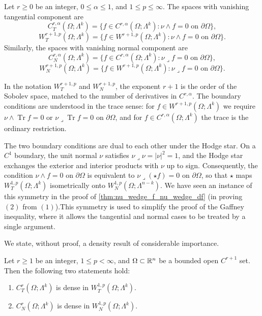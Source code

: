 \begin{definition}
\label{def:WTP-WNP}
Let $r\geq0$ be an integer, $0\leq\alpha\leq1$, and $1\leq p\leq\infty$. The spaces with vanishing tangential component are
\[
    C^{r,\alpha}_T(\Omega;\Lambda^k)
    =
    \bigl\{f\in C^{r,\alpha}(\Omega;\Lambda^k):
    \nu\wedge f=0\text{ on }\partial\Omega\bigr\},
\]
\[
    W^{r+1,p}_T(\Omega;\Lambda^k)
    =
    \bigl\{f\in W^{r+1,p}(\Omega;\Lambda^k):
    \nu\wedge f=0\text{ on }\partial\Omega\bigr\}.
\]
Similarly, the spaces with vanishing normal component are
\[
    C^{r,\alpha}_N(\Omega;\Lambda^k)
    =
    \bigl\{f\in C^{r,\alpha}(\Omega;\Lambda^k):
    \nu\lrcorner f=0\text{ on }\partial\Omega\bigr\},
\]
\[
    W^{r+1,p}_N(\Omega;\Lambda^k)
    =
    \bigl\{f\in W^{r+1,p}(\Omega;\Lambda^k):
    \nu\lrcorner f=0\text{ on }\partial\Omega\bigr\}.
\]
\end{definition}

In the notation $W^{r+1,p}_T$ and $W^{r+1,p}_N$, the exponent $r+1$ is the
order of the Sobolev space, matched to the number of derivatives in
$C^{r,\alpha}$. The boundary conditions are understood in the trace sense:
for $f\in W^{r+1,p}(\Omega;\Lambda^k)$ we require
$\nu\wedge\operatorname{Tr} f=0$ or
$\nu\lrcorner\operatorname{Tr} f=0$ on $\partial\Omega$, and for
$f\in C^{r,\alpha}(\Omega;\Lambda^k)$ the trace is the ordinary
restriction.

\begin{remark}
The two boundary conditions are dual to each other under the Hodge star.
On a $C^1$ boundary, the unit normal $\nu$ satisfies
$\nu\lrcorner\nu=|\nu|^2=1$, and the Hodge star exchanges the exterior and
interior products with $\nu$ up to sign. Consequently, the condition
$\nu\wedge f=0$ on $\partial\Omega$ is equivalent to
$\nu\lrcorner(\star f)=0$ on $\partial\Omega$, so that
$\star$ maps $W^{1,p}_T(\Omega;\Lambda^k)$ isometrically onto
$W^{1,p}_N(\Omega;\Lambda^{n-k})$. We have seen an instance of this symmetry in the proof of \ref{thm:nu_wedge_f_nu_wedge_df} (in proving $(2)$ from $(1)$).This symmetry is used to simplify the proof of the Gaffney inequality, where it allows the tangential and
normal cases to be treated by a single argument.
\end{remark}

We state, without proof, a density result of considerable importance.

\begin{theorem}\label{thm:density_tangential_normal}
Let $r\geq 1$ be an integer, $1\leq p<\infty$, and
$\Omega\subset\mathbb{R}^n$ be a bounded open $C^{r+1}$ set.
Then the following two statements hold:
\begin{enumerate}
    \item[(i)] $C^r_T(\Omega;\Lambda^k)$ is dense in
    $W^{1,p}_T(\Omega;\Lambda^k)$.
    \item[(ii)] $C^r_N(\Omega;\Lambda^k)$ is dense in
    $W^{1,p}_N(\Omega;\Lambda^k)$.
\end{enumerate}
\end{theorem}
